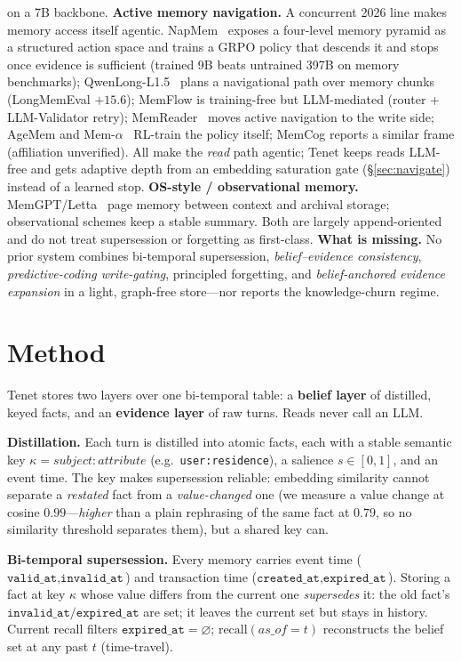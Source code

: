 \documentclass[11pt]{article}
\begin{document}
on a 7B backbone.
\textbf{Active memory navigation.} A concurrent 2026 line makes memory access itself
agentic. NapMem~\cite{napmem} exposes a four-level memory pyramid as a structured action
space and trains a GRPO policy that descends it and stops once evidence is sufficient
(trained 9B beats untrained 397B on memory benchmarks); QwenLong-L1.5~\cite{qwenlong}
plans a navigational path over memory chunks (LongMemEval $+15.6$); MemFlow
\cite{memflow} is training-free but LLM-mediated (router + LLM-Validator retry);
MemReader~\cite{memreader} moves active navigation to the write side; AgeMem
\cite{agemem} and Mem-$\alpha$~\cite{memalpha} RL-train the policy itself; MemCog
\cite{memcog} reports a similar frame (affiliation unverified). All make the \emph{read}
path agentic; Tenet keeps reads LLM-free and gets adaptive depth from an embedding
saturation gate (\S\ref{sec:navigate}) instead of a learned stop.
\textbf{OS-style / observational memory.} MemGPT/Letta~\cite{memgpt} page memory between
context and archival storage; observational schemes keep a stable summary. Both are largely
append-oriented and do not treat supersession or forgetting as first-class.
\textbf{What is missing.} No prior system combines bi-temporal supersession,
\emph{belief--evidence consistency}, \emph{predictive-coding write-gating}, principled
forgetting, and \emph{belief-anchored evidence expansion} in a light, graph-free
store---nor reports the knowledge-churn regime.

\section{Method}
Tenet stores two layers over one bi-temporal table: a \textbf{belief layer} of distilled,
keyed facts, and an \textbf{evidence layer} of raw turns. Reads never call an LLM.

\textbf{Distillation.} Each turn is distilled into atomic facts, each with a stable
semantic key $\kappa=\textit{subject}\!:\!\textit{attribute}$ (e.g.\ \texttt{user:residence}),
a salience $s\in[0,1]$, and an event time. The key makes supersession reliable: embedding
similarity cannot separate a \emph{restated} fact from a \emph{value-changed} one (we measure
a value change at cosine $0.99$---\emph{higher} than a plain rephrasing of the same fact at
$0.79$, so no similarity threshold separates them), but a shared key can.

\textbf{Bi-temporal supersession.} Every memory carries event time
($\texttt{valid\_at},\texttt{invalid\_at}$) and transaction time
($\texttt{created\_at},\texttt{expired\_at}$). Storing a fact at key $\kappa$ whose value
differs from the current one \emph{supersedes} it: the old fact's
$\texttt{invalid\_at}/\texttt{expired\_at}$ are set; it leaves the current set but stays in
history. Current recall filters $\texttt{expired\_at}=\varnothing$; $\text{recall}(as\_of{=}t)$
reconstructs the belief set at any past $t$ (time-travel).
\end{document}
